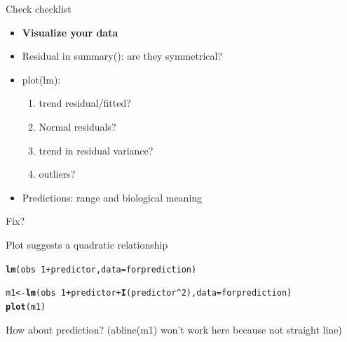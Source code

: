\documentclass[10pt]{beamer}\usepackage[]{graphicx}\usepackage[]{color}
\makeatletter
\newcommand{\hlnum}[1]{\textcolor[rgb]{0.686,0.059,0.569}{#1}}%
\newcommand{\hlopt}[1]{\textcolor[rgb]{0,0,0}{#1}}%
\newcommand{\hlstd}[1]{\textcolor[rgb]{0.345,0.345,0.345}{#1}}%
\newcommand{\hlkwb}[1]{\textcolor[rgb]{0.69,0.353,0.396}{#1}}%
\newcommand{\hlkwc}[1]{\textcolor[rgb]{0.333,0.667,0.333}{#1}}%
\newcommand{\hlkwd}[1]{\textcolor[rgb]{0.737,0.353,0.396}{\textbf{#1}}}%
\newenvironment{kframe}{%
 \def\at@end@of@kframe{}%
 \ifinner\ifhmode%
  \def\at@end@of@kframe{\end{minipage}}%
  \begin{minipage}{\columnwidth}%
 \fi\fi%
 \def\FrameCommand##1{\hskip\@totalleftmargin \hskip-\fboxsep
 \colorbox{shadecolor}{##1}\hskip-\fboxsep
     \hskip-\linewidth \hskip-\@totalleftmargin \hskip\columnwidth}%
 \MakeFramed {\advance\hsize-\width
   \@totalleftmargin\z@ \linewidth\hsize
   \@setminipage}}%
 {\par\unskip\endMakeFramed%
 \at@end@of@kframe}
\newenvironment{knitrout}{}{} %
\makeatother
\begin{document}
\begin{frame}{Check checklist}
  \begin{exampleblock}{}
    \begin{itemize}
      \item \textbf{Visualize your data}
      \item Residual in summary(): are they symmetrical?
      \item plot(lm):
        \begin{enumerate}
          \item trend residual/fitted?
          \item Normal residuals?
          \item trend in residual variance?
          \item outliers?
        \end{enumerate}
      \item Predictions: range and biological meaning
    \end{itemize}
  \end{exampleblock}
  
  
\end{frame}

\begin{frame}[fragile]{Fix?}

Plot suggests a quadratic relationship

\begin{knitrout}\small
{}\color{fgcolor}\begin{kframe}
\begin{alltt}
\hlkwd{lm}\hlstd{(obs} \hlopt{~} \hlnum{1} \hlopt{+} \hlstd{predictor ,} \hlkwc{data}\hlstd{=forprediction)}
\end{alltt}
\end{kframe}
\end{knitrout}
  \pause

\begin{knitrout}\small
{}\color{fgcolor}\begin{kframe}
\begin{alltt}
\hlstd{m1} \hlkwb{<-} \hlkwd{lm}\hlstd{(obs} \hlopt{~} \hlnum{1} \hlopt{+} \hlstd{predictor} \hlopt{+} \hlkwd{I}\hlstd{(predictor}\hlopt{^}\hlnum{2}\hlstd{),} \hlkwc{data}\hlstd{=forprediction)}
\hlkwd{plot}\hlstd{(m1)}
\end{alltt}
\end{kframe}
\end{knitrout}

  How about prediction? (abline(m1) won't work here because not straight line)
\end{frame}
\end{document}
